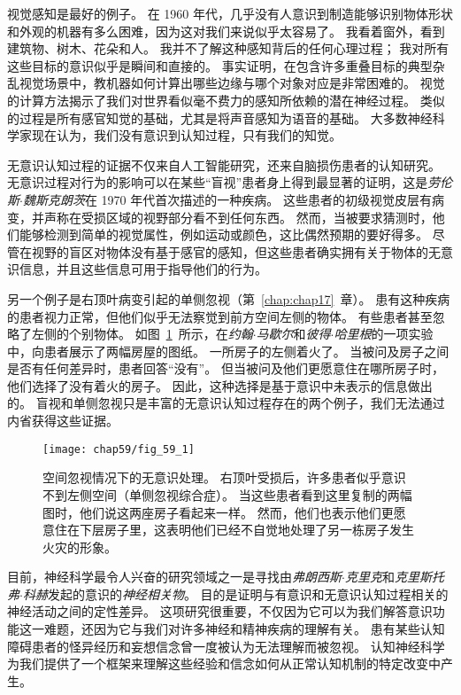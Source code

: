 视觉感知是最好的例子。
在 1960 年代，几乎没有人意识到制造能够识别物体形状和外观的机器有多么困难，因为这对我们来说似乎太容易了。
我看着窗外，看到建筑物、树木、花朵和人。
我并不了解这种感知背后的任何心理过程；
我对所有这些目标的意识似乎是瞬间和直接的。
事实证明，在包含许多重叠目标的典型杂乱视觉场景中，教机器如何计算出哪些边缘与哪个对象对应是非常困难的。
视觉的计算方法揭示了我们对世界看似毫不费力的感知所依赖的潜在神经过程。
类似的过程是所有感官知觉的基础，尤其是将声音感知为语音的基础。
大多数神经科学家现在认为，我们没有意识到认知过程，只有我们的知觉。


无意识认知过程的证据不仅来自人工智能研究，还来自脑损伤患者的认知研究。
无意识过程对行为的影响可以在某些“盲视”患者身上得到最显著的证明，这是\textit{劳伦斯$\cdot$魏斯克朗茨}在 1970 年代首次描述的一种疾病。
这些患者的初级视觉皮层有病变，并声称在受损区域的视野部分看不到任何东西。
然而，当被要求猜测时，他们能够检测到简单的视觉属性，例如运动或颜色，这比偶然预期的要好得多。
尽管在视野的盲区对物体没有基于感官的感知，但这些患者确实拥有关于物体的无意识信息，并且这些信息可用于指导他们的行为。


另一个例子是右顶叶病变引起的单侧忽视（第~\ref{chap:chap17}~章）。
患有这种疾病的患者视力正常，但他们似乎无法察觉到前方空间左侧的物体。
有些患者甚至忽略了左侧的个别物体。
如图~\ref{fig:59_1}~所示，在\textit{约翰$\cdot$马歇尔}和\textit{彼得$\cdot$哈里根}的一项实验中，向患者展示了两幅房屋的图纸。
一所房子的左侧着火了。
当被问及房子之间是否有任何差异时，患者回答“没有”。
但当被问及他们更愿意住在哪所房子时，他们选择了没有着火的房子。
因此，这种选择是基于意识中未表示的信息做出的。
盲视和单侧忽视只是丰富的无意识认知过程存在的两个例子，我们无法通过内省获得这些证据。


\begin{figure}[htbp]
	\centering
	\texttt{[image: chap59/fig\_59\_1]}
	\caption{空间忽视情况下的无意识处理。
		右顶叶受损后，许多患者似乎意识不到左侧空间（单侧忽视综合症）。
		当这些患者看到这里复制的两幅图时，他们说这两座房子看起来一样。
		然而，他们也表示他们更愿意住在下层房子里，这表明他们已经不自觉地处理了另一栋房子发生火灾的形象\cite{marshall1988blindsight}。}
	\label{fig:59_1}
\end{figure}


目前，神经科学最令人兴奋的研究领域之一是寻找由\textit{弗朗西斯$\cdot$克里克}和\textit{克里斯托弗$\cdot$科赫}发起的意识的\textit{神经相关物}。
目的是证明与有意识和无意识认知过程相关的神经活动之间的定性差异。
这项研究很重要，不仅因为它可以为我们解答意识功能这一难题，还因为它与我们对许多神经和精神疾病的理解有关。
患有某些认知障碍患者的怪异经历和妄想信念曾一度被认为无法理解而被忽视。
认知神经科学为我们提供了一个框架来理解这些经验和信念如何从正常认知机制的特定改变中产生。



